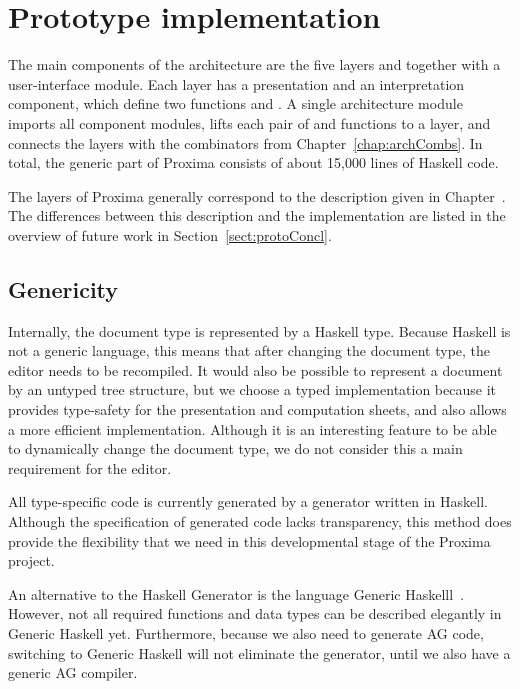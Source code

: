%																
%																
%																
\section{Prototype implementation} \label{sect:proxImpl}


The main components of the architecture are the five layers and together with a user-interface module. 
Each layer has a presentation and an interpretation component, which define two functions  and . A single architecture module imports all component modules, lifts each pair of  and  functions to a layer, and connects the layers with the combinators from Chapter~\ref{chap:archCombs}.  In total, the generic part of Proxima consists of about 15,000 lines of Haskell code. 

The layers of Proxima generally correspond to the description given in Chapter~. The differences between this description and the implementation are listed in the overview of future work in  Section~\ref{sect:protoConcl}.

\subsection{Genericity}

Internally, the document type is represented by a Haskell type. Because Haskell is not a generic language, this means that after changing the document type, the editor needs to be recompiled. It would also be possible to represent a document by an untyped tree structure, but we choose a typed implementation because it provides type-safety for the presentation and computation sheets, and also allows a more efficient implementation. Although it is an interesting feature to be able to dynamically change the document type, we do not consider this a main requirement for the editor.

All type-specific code is currently generated by a generator written in Haskell. Although the specification of generated code lacks transparency, this method does provide the flexibility that we need in this developmental stage of the Proxima project. 

An alternative to the Haskell Generator is the language Generic Haskelll~\cite{clarke02genericHaskell}. However, not all required functions and data types can be described elegantly in Generic Haskell yet. Furthermore, because we also need to generate AG code, switching to Generic Haskell will not eliminate the generator, until we also have a generic AG compiler.


